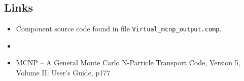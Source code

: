 \subsection*{Links}
\begin{itemize}
  \item Component source code found in file \texttt{Virtual\_mcnp\_output.comp}.
  \item {}
  \item MCNP -- A General Monte Carlo N-Particle Transport Code, Version 5, Volume II: User's Guide, p177
\end{itemize}
